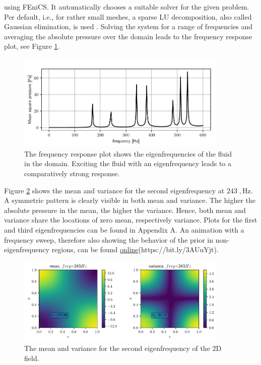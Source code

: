 \documentclass[%
  a4paper,oneside,%
  11pt,%
  smallchapters,
  style=printdev,
  extramargin,
  green,%
  rgb, <cmyk>
  ]{tubsbook}
\begin{document}
using FEniCS. It automatically chooses a suitable solver for the given problem. Per default, i.e., for rather small meshes, a sparse LU decomposition, also called Gaussian elimination, is used \cite{langtangen2016}.
\FloatBarrier
Solving the system for a range of frequencies and averaging the absolute pressure over the domain leads to the frequency response plot, see Figure \ref{fig:frf}.
\begin{figure}[!ht]
\begin{center}
\includegraphics[width=0.9\textwidth]{pics/frf}
\caption[Frequency Response Function for the 2D Helmholtz equation example]{The frequency response plot shows the eigenfrequencies of the fluid in the domain. Exciting the fluid with an eigenfrequency leads to a comparatively strong response.}
\label{fig:frf}
\end{center}
\end{figure}
%
Figure \ref{fig:Eigen243} shows the mean and variance for the second eigenfrequency at $243\;,\mathrm{Hz}$. A symmetric pattern is clearly visible in both mean and variance. The higher the absolute pressure in the mean, the higher the variance. Hence, both mean and variance share the locations of zero mean, respectively variance. Plots for the first and third eigenfrequencies can be found in Appendix A. An animation with a frequency sweep, therefore also showing the behavior of the prior in non-eigenfrequency regions, can be found \href{https://github.com/herluc/Masterarbeit/blob/master/MA_LucasHermann/Python/Results/2D/FreqVar.gif}{online}(https://bit.ly/3AUuYjt).
\begin{figure}[!ht]
\begin{center}
\includegraphics[width=0.9\textwidth]{pics/Freq243}
\caption[The mode shape of the second eigenfrequency of the 2D Helmholtz equation example]{The mean and variance for the second eigenfrequency of the 2D field.}
\label{fig:Eigen243}
\end{center}
\end{figure}
\end{document}
